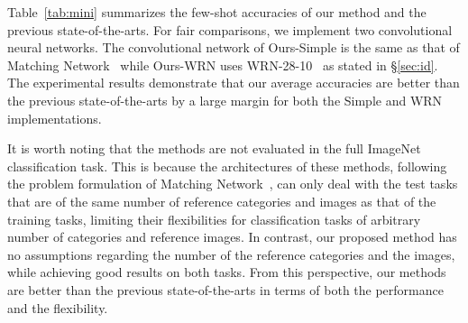Table~\ref{tab:mini} summarizes the few-shot accuracies of our method and the previous state-of-the-arts.
For fair comparisons, we implement two convolutional neural networks.
The convolutional network of Ours-Simple is the same as that of Matching Network~\cite{DBLP:conf/nips/VinyalsBLKW16} while Ours-WRN uses WRN-28-10~\cite{Zagoruyko2016WRN} as stated in \S\ref{sec:id}.
The experimental results demonstrate that our average accuracies are better than the previous state-of-the-arts by a large margin for both the Simple and WRN implementations.

It is worth noting that the methods \cite{pmlr-v70-finn17a,ravi2017optimization,DBLP:conf/nips/VinyalsBLKW16} are not evaluated in the full ImageNet classification task.
This is because the architectures of these methods, following the problem formulation of Matching Network~\cite{DBLP:conf/nips/VinyalsBLKW16}, can only deal with the test tasks that are of the same number of reference categories and images as that of the training tasks, limiting their flexibilities for classification tasks of arbitrary number of categories and reference images.
In contrast, our proposed method has no assumptions regarding the number of the reference categories and the images, while achieving good results on both tasks.
From this perspective, our methods are better than the previous state-of-the-arts in terms of both the performance and the flexibility.
